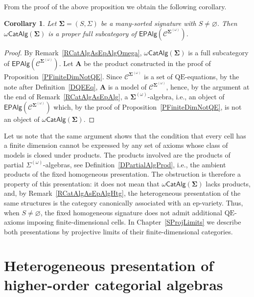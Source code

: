 \documentclass[a4paper, reqno]{amsbook}
\newcommand{\sig}[1]{\mathbf{#1}}             %
\newcommand{\spec}[1]{\boldsymbol{\mathcal{#1}}} %
\newcommand{\QE}{\mathrm{QE}}
\theoremstyle{plain}
\newtheorem{corollary}[theorem]{Corollary}
\theoremstyle{definition}
\begin{document}
From the proof of the above proposition we obtain the following corollary.

\begin{corollary}\label{CProperSubCatAlgOmega}
Let $\sig{\Sigma}=(S,\Sigma)$ be a many-sorted signature with $S\neq\varnothing$.
Then $\omega\mathsf{CatAlg}(\sig{\Sigma})$ is a proper full subcategory of $\mathsf{EPAlg}(\spec{C}^{\sig{\Sigma}^{(\omega)}})$.
\end{corollary}
\begin{proof}
By Remark~\ref{RCatAlgAsEpAlgOmega}, $\omega\mathsf{CatAlg}(\sig{\Sigma})$ is a full subcategory of $\mathsf{EPAlg}(\spec{C}^{\sig{\Sigma}^{(\omega)}})$.
Let $\mathbf{A}$ be the product constructed in the proof of Proposition~\ref{PFiniteDimNotQE}.
Since $\mathcal{C}^{\sig{\Sigma}^{(\omega)}}$ is a set of $\QE$-equations, by the note after Definition~\ref{DQEEq}, $\mathbf{A}$ is a model of $\spec{C}^{\sig{\Sigma}^{(\omega)}}$, hence, by the argument at the end of Remark~\ref{RCatAlgAsEpAlg}, a $\sig{\Sigma}^{(\omega)}$-algebra, i.e., an object of $\mathsf{EPAlg}(\spec{C}^{\sig{\Sigma}^{(\omega)}})$ which, by the proof of Proposition~\ref{PFiniteDimNotQE}, is not an object of $\omega\mathsf{CatAlg}(\sig{\Sigma})$.
\end{proof}

Let us note that the same argument shows that the condition that every cell has a finite dimension cannot be expressed by any set of axioms whose class of models is closed under products.
The products involved are the products of partial $\Sigma^{(\omega)}$-algebras, see Definition~\ref{DPartialAlgProd}, i.e., the ambient products of the fixed homogeneous presentation.
The obstruction is therefore a property of this presentation: it does not mean that $\omega\mathsf{CatAlg}(\sig{\Sigma})$ lacks products, and, by Remark~\ref{RCatAlgAsEpAlgHtg}, the heterogeneous presentation of the same structures is the category canonically associated with an ep-variety.
Thus, when $S\neq\varnothing$, the fixed homogeneous signature does not admit additional $\QE$-axioms imposing finite-dimensional cells.
In Chapter~\ref{SProjLimits} we describe both presentations by projective limits of their finite-dimensional categories.

\chapter[Heterogeneous presentation]{Heterogeneous presentation of higher-order categorial algebras}\label{SHeterogeneous}
\end{document}
